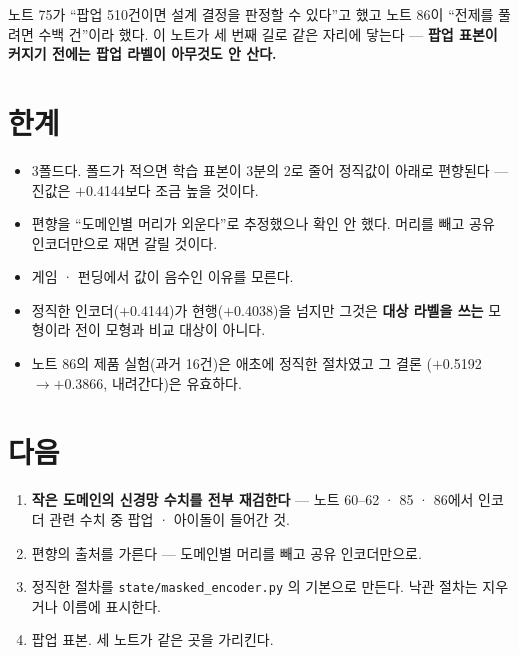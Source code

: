 \documentclass[10pt]{article}
\begin{document}

노트 75가 ``팝업 510건이면 설계 결정을 판정할 수 있다''고 했고 노트 86이
``전제를 풀려면 수백 건''이라 했다. 이 노트가 세 번째 길로 같은 자리에 닿는다
--- \textbf{팝업 표본이 커지기 전에는 팝업 라벨이 아무것도 안 산다.}

\section{한계}

\begin{itemize}[leftmargin=1.1em,itemsep=0.15em]
\item 3폴드다. 폴드가 적으면 학습 표본이 3분의 2로 줄어 정직값이 아래로
      편향된다 --- 진값은 $+$0.4144보다 조금 높을 것이다.
\item 편향을 ``도메인별 머리가 외운다''로 추정했으나 확인 안 했다. 머리를
      빼고 공유 인코더만으로 재면 갈릴 것이다.
\item 게임 · 펀딩에서 값이 음수인 이유를 모른다.
\item 정직한 인코더($+$0.4144)가 현행($+$0.4038)을 넘지만 그것은 \textbf{대상
      라벨을 쓰는} 모형이라 전이 모형과 비교 대상이 아니다.
\item 노트 86의 제품 실험(과거 16건)은 애초에 정직한 절차였고 그 결론
      ($+$0.5192$\to+$0.3866, 내려간다)은 유효하다.
\end{itemize}

\section{다음}

\begin{enumerate}[leftmargin=1.3em,itemsep=0.15em]
\item \textbf{작은 도메인의 신경망 수치를 전부 재검한다} --- 노트 60--62 · 85 ·
      86에서 인코더 관련 수치 중 팝업 · 아이돌이 들어간 것.
\item 편향의 출처를 가른다 --- 도메인별 머리를 빼고 공유 인코더만으로.
\item 정직한 절차를 \texttt{state/masked\_encoder.py} 의 기본으로 만든다.
      낙관 절차는 지우거나 이름에 표시한다.
\item 팝업 표본. 세 노트가 같은 곳을 가리킨다.
\end{enumerate}
\end{document}
